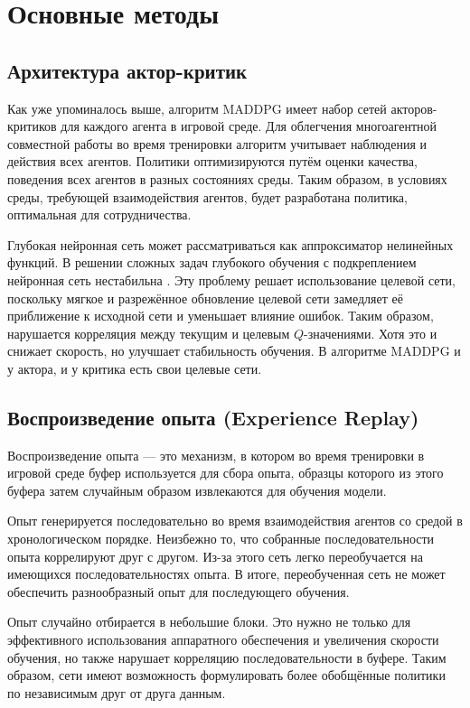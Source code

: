 \section{Основные методы}

\subsection{Архитектура актор-критик}

Как уже упоминалось выше, алгоритм MADDPG имеет набор сетей акторов-критиков для каждого агента в игровой среде. Для облегчения многоагентной совместной работы во время тренировки алгоритм учитывает наблюдения и действия всех агентов. Политики оптимизируются путём оценки качества, поведения всех агентов в разных состояниях среды. Таким образом, в условиях среды, требующей взаимодействия агентов, будет разработана политика, оптимальная для сотрудничества.

Глубокая нейронная сеть может рассматриваться как аппроксиматор нелинейных функций. В решении сложных задач глубокого обучения с подкреплением нейронная сеть нестабильна \cite{lillicrap2015continuous}. Эту проблему решает использование целевой сети, поскольку мягкое и разрежённое обновление целевой сети замедляет её приближение к исходной сети и уменьшает влияние ошибок. Таким образом, нарушается корреляция между текущим и целевым $Q$-значениями. Хотя это и снижает скорость, но улучшает стабильность обучения. В алгоритме MADDPG и у актора, и у критика есть свои целевые сети.

\subsection{Воспроизведение опыта (Experience Replay)}

Воспроизведение опыта — это механизм, в котором во время тренировки в игровой среде буфер используется для сбора опыта, образцы которого из этого буфера затем случайным образом извлекаются для обучения модели.

Опыт генерируется последовательно во время взаимодействия агентов со средой в хронологическом порядке. Неизбежно то, что собранные последовательности опыта коррелируют друг с другом. Из-за этого сеть легко переобучается на имеющихся последовательностях опыта. В итоге, переобученная сеть не может обеспечить разнообразный опыт для последующего обучения.

Опыт случайно отбирается в небольшие блоки. Это нужно не только для эффективного использования аппаратного обеспечения и увеличения скорости обучения, но также нарушает корреляцию последовательности в буфере. Таким образом, сети имеют возможность формулировать более обобщённые политики по независимым друг от друга данным.

